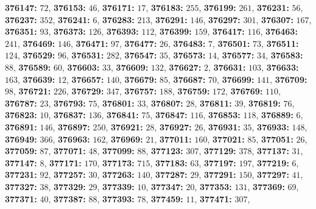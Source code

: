 \textsf{\bfseries 376147:} $72$, \textsf{\bfseries 376153:} $46$, \textsf{\bfseries 376171:} $17$, \textsf{\bfseries 376183:} $255$, \textsf{\bfseries 376199:} $261$, \textsf{\bfseries 376231:} $56$, \textsf{\bfseries 376237:} $352$, \textsf{\bfseries 376241:} $6$, \textsf{\bfseries 376283:} $213$, \textsf{\bfseries 376291:} $146$, \textsf{\bfseries 376297:} $301$, \textsf{\bfseries 376307:} $167$, \textsf{\bfseries 376351:} $93$, \textsf{\bfseries 376373:} $126$, \textsf{\bfseries 376393:} $112$, \textsf{\bfseries 376399:} $159$, \textsf{\bfseries 376417:} $116$, \textsf{\bfseries 376463:} $241$, \textsf{\bfseries 376469:} $146$, \textsf{\bfseries 376471:} $97$, \textsf{\bfseries 376477:} $26$, \textsf{\bfseries 376483:} $7$, \textsf{\bfseries 376501:} $73$, \textsf{\bfseries 376511:} $124$, \textsf{\bfseries 376529:} $96$, \textsf{\bfseries 376531:} $282$, \textsf{\bfseries 376547:} $35$, \textsf{\bfseries 376573:} $14$, \textsf{\bfseries 376577:} $34$, \textsf{\bfseries 376583:} $88$, \textsf{\bfseries 376589:} $60$, \textsf{\bfseries 376603:} $33$, \textsf{\bfseries 376609:} $132$, \textsf{\bfseries 376627:} $2$, \textsf{\bfseries 376631:} $103$, \textsf{\bfseries 376633:} $163$, \textsf{\bfseries 376639:} $12$, \textsf{\bfseries 376657:} $140$, \textsf{\bfseries 376679:} $85$, \textsf{\bfseries 376687:} $70$, \textsf{\bfseries 376699:} $141$, \textsf{\bfseries 376709:} $98$, \textsf{\bfseries 376721:} $226$, \textsf{\bfseries 376729:} $347$, \textsf{\bfseries 376757:} $188$, \textsf{\bfseries 376759:} $172$, \textsf{\bfseries 376769:} $110$, \textsf{\bfseries 376787:} $23$, \textsf{\bfseries 376793:} $75$, \textsf{\bfseries 376801:} $33$, \textsf{\bfseries 376807:} $28$, \textsf{\bfseries 376811:} $39$, \textsf{\bfseries 376819:} $76$, \textsf{\bfseries 376823:} $10$, \textsf{\bfseries 376837:} $136$, \textsf{\bfseries 376841:} $75$, \textsf{\bfseries 376847:} $116$, \textsf{\bfseries 376853:} $118$, \textsf{\bfseries 376889:} $6$, \textsf{\bfseries 376891:} $146$, \textsf{\bfseries 376897:} $250$, \textsf{\bfseries 376921:} $28$, \textsf{\bfseries 376927:} $26$, \textsf{\bfseries 376931:} $35$, \textsf{\bfseries 376933:} $148$, \textsf{\bfseries 376949:} $366$, \textsf{\bfseries 376963:} $162$, \textsf{\bfseries 376969:} $21$, \textsf{\bfseries 377011:} $160$, \textsf{\bfseries 377021:} $85$, \textsf{\bfseries 377051:} $26$, \textsf{\bfseries 377059:} $87$, \textsf{\bfseries 377071:} $48$, \textsf{\bfseries 377099:} $88$, \textsf{\bfseries 377123:} $307$, \textsf{\bfseries 377129:} $378$, \textsf{\bfseries 377137:} $31$, \textsf{\bfseries 377147:} $8$, \textsf{\bfseries 377171:} $170$, \textsf{\bfseries 377173:} $715$, \textsf{\bfseries 377183:} $63$, \textsf{\bfseries 377197:} $197$, \textsf{\bfseries 377219:} $6$, \textsf{\bfseries 377231:} $92$, \textsf{\bfseries 377257:} $30$, \textsf{\bfseries 377263:} $140$, \textsf{\bfseries 377287:} $29$, \textsf{\bfseries 377291:} $150$, \textsf{\bfseries 377297:} $41$, \textsf{\bfseries 377327:} $38$, \textsf{\bfseries 377329:} $29$, \textsf{\bfseries 377339:} $10$, \textsf{\bfseries 377347:} $20$, \textsf{\bfseries 377353:} $131$, \textsf{\bfseries 377369:} $69$, \textsf{\bfseries 377371:} $40$, \textsf{\bfseries 377387:} $88$, \textsf{\bfseries 377393:} $78$, \textsf{\bfseries 377459:} $11$, \textsf{\bfseries 377471:} $307$, 

